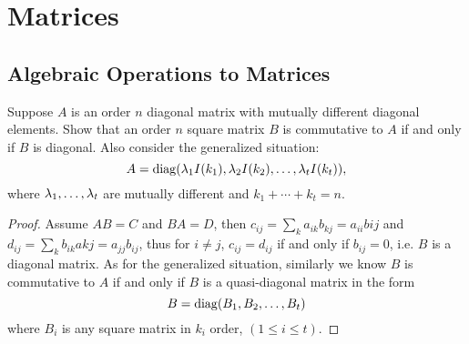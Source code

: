 \chapter{Matrices}
\section{Algebraic Operations to Matrices}
\begin{pro}%
	Suppose $A$ is an order $n$ diagonal matrix with mutually different diagonal elements. Show that an order $n$ square matrix $B$ is commutative to $A$ if and only if $B$ is diagonal. Also consider the generalized situation:
	\[A=\operatorname*{diag}(\lambda_1 I(k_1),\lambda_2 I(k_2),\ldots,\lambda_t I(k_t)),\]
	where $\lambda_1,\ldots,\lambda_t$ are mutually different and $k_1+\cdots+k_t=n$.
\end{pro}
\begin{proof}
	Assume $AB=C$ and $BA=D$, then $c_{ij}=\sum_k a_{ik}b_{kj}=a_{ii}b{ij}$ and $d_{ij}=\sum_k b_{ik}a{kj}=a_{jj}b_{ij}$, thus for $i\neq j$, $c_{ij}=d_{ij}$ if and only if $b_{ij}=0$, i.e. $B$ is a diagonal matrix. As for the generalized situation, similarly we know $B$ is commutative to $A$ if and only if $B$ is a quasi-diagonal matrix in the form
	\[B=\operatorname*{diag}(B_1,B_2,\ldots,B_t)\]
	where $B_i$ is any square matrix in $k_i$ order, $(1\leq i\leq t)$.
\end{proof}

